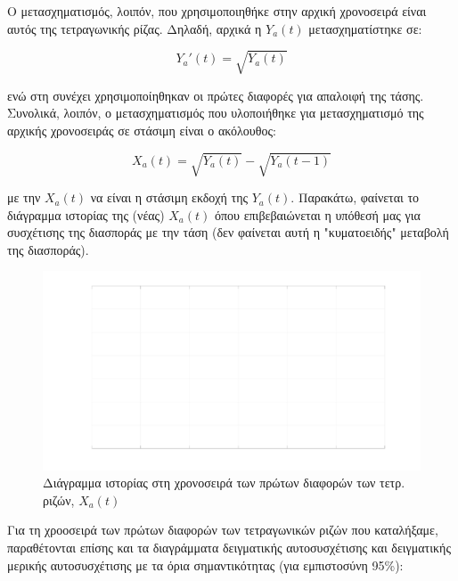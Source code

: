 Ο μετασχηματισμός, λοιπόν, που χρησιμοποιηθήκε στην αρχική χρονοσειρά είναι αυτός της τετραγωνικής ρίζας. Δηλαδή, αρχικά η $Y_a(t)$ μετασχηματίστηκε σε:

\[ Y_a'(t) = \sqrt{Y_a(t)} \]

ενώ στη συνέχει χρησιμοποίηθηκαν οι πρώτες διαφορές για απαλοιφή της τάσης. Συνολικά, λοιπόν, ο μετασχηματισμός που υλοποιήθηκε για μετασχηματισμό της αρχικής χρονοσειράς σε στάσιμη είναι ο ακόλουθος:

\[ X_a(t) = \sqrt{Y_a(t)} - \sqrt{Y_a(t-1)} \]

με την $X_a(t)$ να είναι η στάσιμη εκδοχή της $Y_a(t)$. Παρακάτω, φαίνεται το διάγραμμα ιστορίας της (νέας) $X_a(t)$ όπου επιβεβαιώνεται η υπόθεσή μας για συσχέτισης της διασποράς με την τάση (δεν φαίνεται αυτή η "κυματοειδής" μεταβολή της διασποράς).

\begin{figure}[H]
    \begin{center}
        \includegraphics[width=\textwidth]{plots/xa_sqrt_of_1st_differences_history.svg.pdf}
        \caption{Διάγραμμα ιστορίας στη χρονοσειρά των πρώτων διαφορών των τετρ. ριζών, \emph{${X_a(t)}$}}
        \label{fig:xa_sqrt_of_1st_differences_history}
    \end{center}
\end{figure}

Για τη χροοσειρά των πρώτων διαφορών των τετραγωνικών ριζών που καταλήξαμε, παραθέτονται επίσης και τα διαγράμματα δειγματικής αυτοσυσχέτισης και δειγματικής μερικής αυτοσυσχέτισης με τα όρια σημαντικότητας (για εμπιστοσύνη 95\%):

